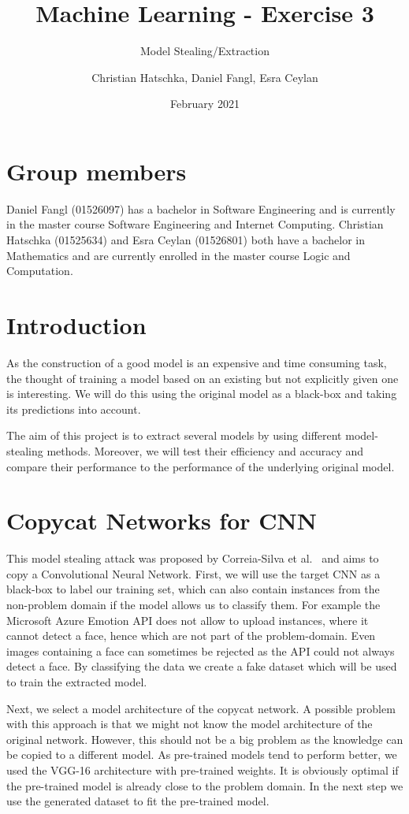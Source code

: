 \documentclass[a4paper,11pt]{article}
\title{Machine Learning - Exercise 3}
\subtitle{Model Stealing/Extraction}
\author{Christian Hatschka, Daniel Fangl, Esra Ceylan}
\date{February 2021}
\begin{document}
\maketitle

\section{Group members}
    Daniel Fangl (01526097) has a bachelor in Software Engineering and is currently in the master course Software Engineering and Internet Computing. Christian Hatschka (01525634) and Esra Ceylan (01526801) both have a bachelor in Mathematics and are currently enrolled in the master course Logic and Computation.
    
\section{Introduction}
    As the construction of a good model is an expensive and time consuming task, the thought of training a model based on an existing but not explicitly given one is interesting. We will do this using the original model as a black-box and taking its predictions into account.
    
    The aim of this project is to extract several models by using different model-stealing methods. Moreover, we will test their efficiency and accuracy and compare their performance to the performance of the underlying original model.
    
\section{Copycat Networks for CNN}
    This model stealing attack was proposed by Correia-Silva et al.~\cite{copycat} and aims to copy a Convolutional Neural Network. First, we will use the target CNN as a black-box to label our training set, which can also contain instances from the non-problem domain if the model allows us to classify them. For example the Microsoft Azure Emotion API does not allow to upload instances, where it cannot detect a face, hence which are not part of the problem-domain. Even images containing a face can sometimes be rejected as the API could not always detect a face. By classifying the data we create a fake dataset which will be used to train the extracted model.
    
    Next, we select a model architecture of the copycat network. A possible problem with this approach is that we might not know the model architecture of the original network. However, this should not be a big problem as the knowledge can be copied to a different model.
    As pre-trained models tend to perform better, we used the VGG-16 architecture with pre-trained weights. It is obviously optimal if the pre-trained model is already close to the problem domain. In the next step we use the generated dataset to fit the pre-trained model.
    
\end{document}
